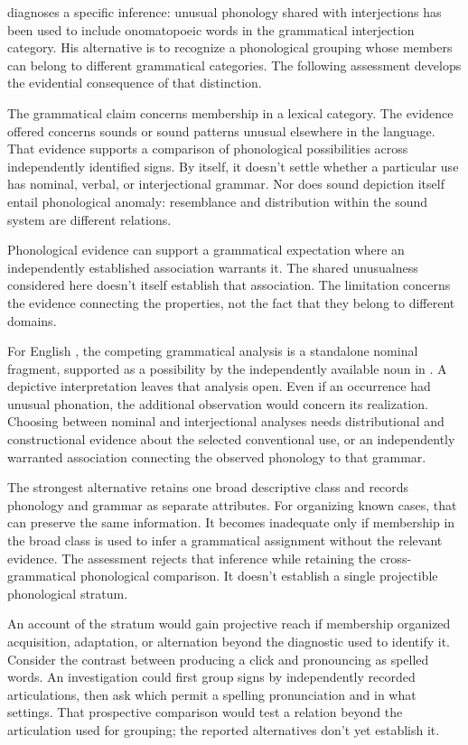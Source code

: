 \documentclass[12pt]{article}
\begin{document}
\textcite[112--113]{ameka1992} diagnoses a specific inference: unusual
phonology shared with interjections has been used to include onomatopoeic
words in the grammatical interjection category. His alternative is to
recognize a phonological grouping whose members can belong to different
grammatical categories. The following assessment develops the evidential
consequence of that distinction.

The grammatical claim concerns membership in a lexical category. The
evidence offered concerns sounds or sound patterns unusual elsewhere in
the language. That evidence supports a comparison of phonological
possibilities across independently identified signs. By itself, it doesn't
settle whether a particular use has nominal, verbal, or interjectional
grammar. Nor does sound depiction itself entail phonological anomaly: resemblance
and distribution within the sound system are different relations.

Phonological evidence can support a grammatical expectation where an
independently established association warrants it. The shared unusualness
considered here doesn't itself establish that association. The limitation
concerns the evidence connecting the properties, not the fact that they
belong to different domains.

For English , the competing grammatical analysis is a
standalone nominal fragment, supported as a possibility by the independently
available noun in . A depictive interpretation leaves
that analysis open. Even if an occurrence had unusual phonation, the
additional observation would concern its realization. Choosing between
nominal and interjectional analyses needs distributional and constructional
evidence about the selected conventional use, or an independently warranted
association connecting the observed phonology to that grammar.

The strongest alternative retains one broad descriptive class and records
phonology and grammar as separate attributes. For organizing known cases,
that can preserve the same information. It becomes inadequate only if
membership in the broad class is used to infer a grammatical assignment
without the relevant evidence. The assessment rejects
that inference while retaining the cross-grammatical phonological
comparison. It doesn't establish a single projectible phonological stratum.

An account of the stratum would gain projective reach if membership
organized acquisition, adaptation, or alternation beyond the diagnostic
used to identify it. Consider the contrast between producing a click
and pronouncing  as spelled words. An investigation
could first group signs by independently recorded articulations, then
ask which permit a spelling pronunciation and in what settings.
That prospective comparison would test a relation beyond the articulation
used for grouping; the reported alternatives don't yet establish it.
\end{document}
